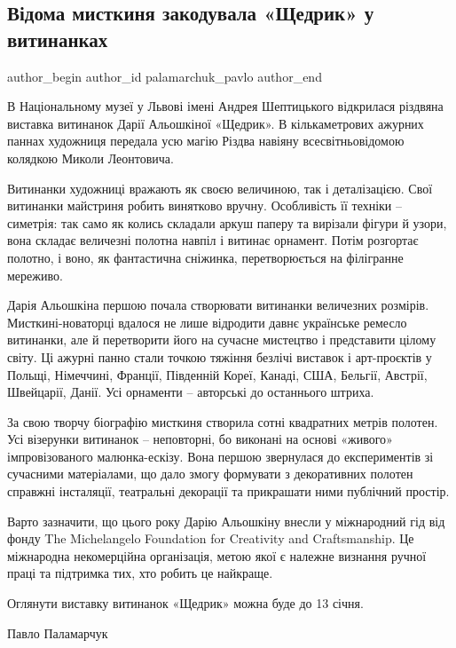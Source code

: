  
 
 
 
 
\subsection{Відома мисткиня закодувала «Щедрик» у витинанках}
\label{sec:15_12_2021.stz.news.ua.den.1.schedryk_vystavka}


\ifcmt
 author_begin
   author_id palamarchuk_pavlo
 author_end
\fi

В Національному музеї у Львові імені Андрея Шептицького  відкрилася різдвяна
виставка витинанок Дарії Альошкіної «Щедрик». В кількаметрових ажурних паннах
художниця передала усю магію Різдва навіяну всесвітньовідомою колядкою Миколи
Леонтовича.


Витинанки художниці вражають як своєю величиною, так і деталізацією. Свої
витинанки майстриня робить винятково вручну. Особливість її техніки  –
симетрія: так само як колись складали аркуш паперу та вирізали фігури й узори,
вона складає величезні полотна навпіл і витинає орнамент. Потім розгортає
полотно, і воно, як фантастична сніжинка, перетворюється на філігранне
мереживо.

Дарія Альошкіна першою почала створювати витинанки величезних розмірів.
Мисткині-новаторці вдалося не лише відродити давнє українське ремесло
витинанки, але й перетворити його на сучасне мистецтво і представити цілому
світу. Ці ажурні панно стали точкою тяжіння безлічі виставок і арт-проєктів у
Польщі, Німеччині, Франції, Південній Кореї, Канаді, США, Бельгії, Австрії,
Швейцарії, Данії. Усі орнаменти – авторські до останнього штриха.


За свою творчу біографію мисткиня створила сотні квадратних метрів полотен. Усі
візерунки витинанок – неповторні, бо виконані на основі «живого»
імпровізованого малюнка-ескізу. Вона першою звернулася до експериментів зі
сучасними матеріалами, що дало змогу формувати з декоративних полотен справжні
інсталяції, театральні декорації та прикрашати ними публічний простір.

Варто зазначити, що цього року Дарію Альошкіну внесли у міжнародний гід від
фонду The Michelangelo Foundation for Creativity and Craftsmanship. Це
міжнародна некомерційна організація, метою якої є належне визнання  ручної
праці та підтримка тих, хто робить це найкраще.

Оглянути виставку витинанок «Щедрик» можна буде до 13 січня.

Павло Паламарчук
